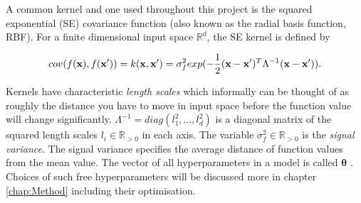 \documentclass[12pt,a4paper]{report}
\theoremstyle{definition}
\begin{document}
A common kernel and one used throughout this project is the squared exponential (SE) covariance function (also known as the radial basis function, RBF). 
For a finite dimensional input space $\mathbb{R}^d$, the SE kernel is defined by

\begin{equation}
	\centering
	cov(f(\textbf{x}), f(\textbf{x}')) = k(\textbf{x}, \textbf{x}') = \sigma_{f}^2 exp(-\frac{1}{2} (\textbf{x} - \textbf{x}')^T \Lambda^{-1} (\textbf{x} - \textbf{x}')).
	\label{eq:SquaredExponentialKernel}
\end{equation}

Kernels have characteristic \emph{length scales} which informally can be thought of as roughly the distance you have to move in input space before the function value will change significantly. 
$\Lambda^{-1}  = diag(l_{1}^2, ... , l_{d}^2)$ is a diagonal matrix of the squared length scales $l_{i} \in \mathbb{R}_{>0}$ in each axis.
The variable $\sigma_{f}^2 \in \mathbb{R}_{>0}$ is the \emph{signal variance}.
The signal variance specifies the average distance of function values from the mean value.
The vector of all hyperparameters in a model is called $\boldsymbol{\theta}$ \citep{RasmussenWilliams2006}.
Choices of such free hyperparameters will be discussed more in chapter \ref{chap:Method} including their optimisation. 
\end{document}
